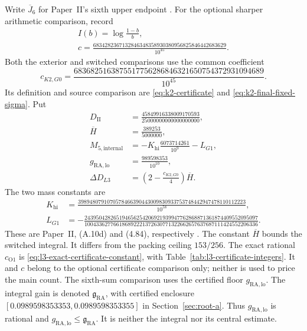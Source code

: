 Write $\overline J_6$ for Paper~II's sixth upper endpoint
\cite[(6.1), (6.3a)]{PaperII}.
For the optional sharper arithmetic comparison, record
\begin{equation}\label{eq:intro-exterior-constant}
 \begin{gathered}
 I(b)=\log\frac{1-b}{b},\\
 c=\frac{6834282367132846348358930380956825846442683629}{10^{45}}.
 \end{gathered}
\end{equation}
Both the exterior and switched comparisons use the common coefficient
\begin{equation}\label{eq:intro-fallback-constant}
 c_{K2,G0}=\frac{6836825163875517756286846321650754372931094689}{10^{45}}.
\end{equation}
Its definition and source comparison are \eqref{eq:k2-certificate}
and \eqref{eq:k2-final-fixed-sigma}.
Put
\begin{equation}\label{eq:intro-components}
\begin{aligned}
 D_{\mathrm{II}}&=\frac{45849916338009170593}{25000000000000000000},\\
 \overline H&=\frac{389253}{5000000},\\
 M_{5,\mathrm{internal}}&=-K_{\mathrm{hi}}\frac{6073714261}{10^9}-L_{G1},\\
 g_{\mathrm{RA,lo}}&=\frac{989598353}{10^{10}},\\
 \Delta D_{L3}&=\left(2-\frac{c_{K2,G0}}4\right)\overline H.
\end{aligned}
\end{equation}
The two mass constants are
\begin{equation}\label{eq:intro-G1-constants}
\begin{aligned}
 K_{\mathrm{hi}}&=
 \frac{3989480791070578466390443009830933753748442947478110112223}{10^{58}},\\
 L_{G1}&=-\frac{243950428265194656254206921939947762868871361874409552095097}
 {100433627766186892221372630771322662657637687111424552206336}.
\end{aligned}
\end{equation}
These are Paper~II, (A.10d) and (4.84), respectively
\cite[(A.10d), (4.84)]{PaperII}.
The constant $\overline H$ bounds the switched integral.
It differs from the packing ceiling $153/256$.
The exact rational $c_{\mathrm{O1}}$ is
\eqref{eq:l3-exact-certificate-constant},
with Table~\ref{tab:l3-certificate-integers}.
It and $c$ belong to the optional certificate comparison only;
neither is used to price the main count.
The sixth-sum comparison uses the certified floor $g_{\mathrm{RA,lo}}$.
The integral gain is denoted $\mathfrak g_{\mathrm{RA}}$, with certified
enclosure $[0.0989598353353,0.0989598353355]$ in
Section~\ref{sec:root-a}. Thus $g_{\mathrm{RA,lo}}$ is rational and
$g_{\mathrm{RA,lo}}\le\mathfrak g_{\mathrm{RA}}$. It is neither the integral nor its central estimate.

